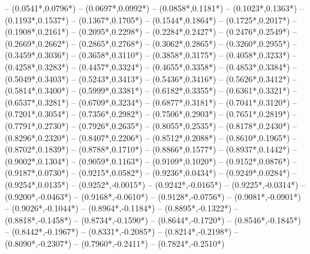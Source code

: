 {	-- ({0.0541*\dx},{0.0796*\dy})
	-- ({0.0697*\dx},{0.0992*\dy})
	-- ({0.0858*\dx},{0.1181*\dy})
	-- ({0.1023*\dx},{0.1363*\dy})
	-- ({0.1193*\dx},{0.1537*\dy})
	-- ({0.1367*\dx},{0.1705*\dy})
	-- ({0.1544*\dx},{0.1864*\dy})
	-- ({0.1725*\dx},{0.2017*\dy})
	-- ({0.1908*\dx},{0.2161*\dy})
	-- ({0.2095*\dx},{0.2298*\dy})
	-- ({0.2284*\dx},{0.2427*\dy})
	-- ({0.2476*\dx},{0.2549*\dy})
	-- ({0.2669*\dx},{0.2662*\dy})
	-- ({0.2865*\dx},{0.2768*\dy})
	-- ({0.3062*\dx},{0.2865*\dy})
	-- ({0.3260*\dx},{0.2955*\dy})
	-- ({0.3459*\dx},{0.3036*\dy})
	-- ({0.3658*\dx},{0.3110*\dy})
	-- ({0.3858*\dx},{0.3175*\dy})
	-- ({0.4058*\dx},{0.3233*\dy})
	-- ({0.4258*\dx},{0.3283*\dy})
	-- ({0.4457*\dx},{0.3324*\dy})
	-- ({0.4655*\dx},{0.3358*\dy})
	-- ({0.4853*\dx},{0.3384*\dy})
	-- ({0.5049*\dx},{0.3403*\dy})
	-- ({0.5243*\dx},{0.3413*\dy})
	-- ({0.5436*\dx},{0.3416*\dy})
	-- ({0.5626*\dx},{0.3412*\dy})
	-- ({0.5814*\dx},{0.3400*\dy})
	-- ({0.5999*\dx},{0.3381*\dy})
	-- ({0.6182*\dx},{0.3355*\dy})
	-- ({0.6361*\dx},{0.3321*\dy})
	-- ({0.6537*\dx},{0.3281*\dy})
	-- ({0.6709*\dx},{0.3234*\dy})
	-- ({0.6877*\dx},{0.3181*\dy})
	-- ({0.7041*\dx},{0.3120*\dy})
	-- ({0.7201*\dx},{0.3054*\dy})
	-- ({0.7356*\dx},{0.2982*\dy})
	-- ({0.7506*\dx},{0.2903*\dy})
	-- ({0.7651*\dx},{0.2819*\dy})
	-- ({0.7791*\dx},{0.2730*\dy})
	-- ({0.7926*\dx},{0.2635*\dy})
	-- ({0.8055*\dx},{0.2535*\dy})
	-- ({0.8178*\dx},{0.2430*\dy})
	-- ({0.8296*\dx},{0.2320*\dy})
	-- ({0.8407*\dx},{0.2206*\dy})
	-- ({0.8512*\dx},{0.2088*\dy})
	-- ({0.8610*\dx},{0.1965*\dy})
	-- ({0.8702*\dx},{0.1839*\dy})
	-- ({0.8788*\dx},{0.1710*\dy})
	-- ({0.8866*\dx},{0.1577*\dy})
	-- ({0.8937*\dx},{0.1442*\dy})
	-- ({0.9002*\dx},{0.1304*\dy})
	-- ({0.9059*\dx},{0.1163*\dy})
	-- ({0.9109*\dx},{0.1020*\dy})
	-- ({0.9152*\dx},{0.0876*\dy})
	-- ({0.9187*\dx},{0.0730*\dy})
	-- ({0.9215*\dx},{0.0582*\dy})
	-- ({0.9236*\dx},{0.0434*\dy})
	-- ({0.9249*\dx},{0.0284*\dy})
	-- ({0.9254*\dx},{0.0135*\dy})
	-- ({0.9252*\dx},{-0.0015*\dy})
	-- ({0.9242*\dx},{-0.0165*\dy})
	-- ({0.9225*\dx},{-0.0314*\dy})
	-- ({0.9200*\dx},{-0.0463*\dy})
	-- ({0.9168*\dx},{-0.0610*\dy})
	-- ({0.9128*\dx},{-0.0756*\dy})
	-- ({0.9081*\dx},{-0.0901*\dy})
	-- ({0.9026*\dx},{-0.1044*\dy})
	-- ({0.8964*\dx},{-0.1184*\dy})
	-- ({0.8895*\dx},{-0.1322*\dy})
	-- ({0.8818*\dx},{-0.1458*\dy})
	-- ({0.8734*\dx},{-0.1590*\dy})
	-- ({0.8644*\dx},{-0.1720*\dy})
	-- ({0.8546*\dx},{-0.1845*\dy})
	-- ({0.8442*\dx},{-0.1967*\dy})
	-- ({0.8331*\dx},{-0.2085*\dy})
	-- ({0.8214*\dx},{-0.2198*\dy})
	-- ({0.8090*\dx},{-0.2307*\dy})
	-- ({0.7960*\dx},{-0.2411*\dy})
	-- ({0.7824*\dx},{-0.2510*\dy})
}
